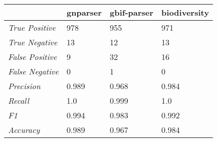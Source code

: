 \documentclass{article}
\begin{document}
    \resizebox{20cm}{!} {\begin{tabular}{|l|*{3}{l}|}
      \hline
                             & gnparser & gbif-parser & biodiversity \\
      \hline
      \textit{True Positive} & 978      & 955         & 971          \\
      \textit{True Negative} & 13       & 12          & 13           \\
      \textit{False Positive}& 9        & 32          & 16           \\
      \textit{False Negative}& 0        & 1           & 0            \\
      \textit{Precision}     & 0.989    & 0.968       & 0.984        \\
      \textit{Recall}        & 1.0      & 0.999       & 1.0          \\
      \textit{F1}            & 0.994    & 0.983       & 0.992        \\
      \textit{Accuracy}      & 0.989    & 0.967       & 0.984        \\
      \hline
    \end{tabular}
    }
\end{document}
